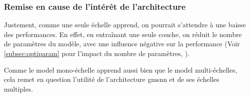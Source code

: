 \subsubsection{Remise en cause de l'intérêt de l'architecture}
Justement, comme une seule échelle apprend, on pourrait s'attendre à une baisse des performances. En effet, en entraînant une seule couche, on réduit le nombre de paramètres du modèle, avec une influence négative sur la performance (Voir \autoref{subsec:optiparam} pour l'impact du nombre de paramètres, ).

Comme le \gls{model} mono-échelle apprend aussi bien que le \gls{model} multi-échelles, cela remet en question l'utilité de l'architecture \gls{gmsnn} et de ses échelles multiples.
